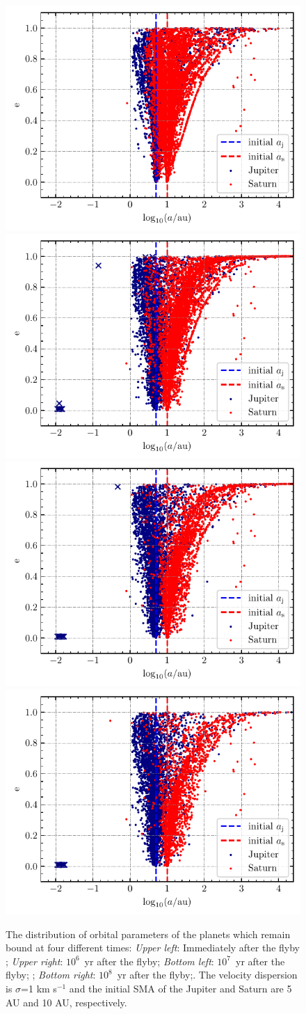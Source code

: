 \documentclass[twocolumn]{aastex63}
\begin{document}
\begin{figure}
    \includegraphics[width=.45\textwidth]{figs/ae-flyby_inone-r2.pdf}
    \includegraphics[width=.45\textwidth]{figs/ae-1e6_inone-r2.pdf}\\
    \includegraphics[width=.45\textwidth]{figs/ae-1e7_inone-r2.pdf}
    \includegraphics[width=.45\textwidth]{figs/ae-1e8_inone-r2.pdf}
    \caption{The distribution of orbital parameters of the planets which remain bound at four different times:
    \textit{Upper left}: Immediately after the flyby ; \textit{Upper right}: $10^6$~yr after the flyby; \textit{Bottom left}: $10^7$~yr after the flyby; ; \textit{Bottom right}: $10^8$~yr after the flyby;. The velocity dispersion is $\sigma$=1 km s$^{-1}$ and the initial SMA of the Jupiter and Saturn are 5 AU and 10 AU, respectively.}
    \label{Fig:a-etot-r2}
\end{figure}
\end{document}
